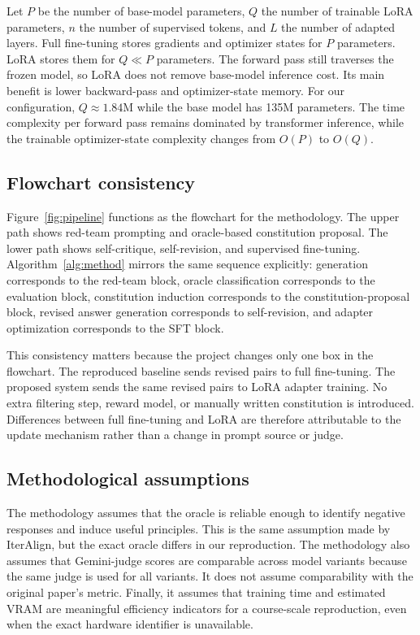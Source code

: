 \documentclass[10pt,twocolumn]{article}
\begin{document}
Let $P$ be the number of base-model parameters, $Q$ the number of trainable LoRA parameters, $n$ the number of supervised tokens, and $L$ the number of adapted layers. Full fine-tuning stores gradients and optimizer states for $P$ parameters. LoRA stores them for $Q \ll P$ parameters. The forward pass still traverses the frozen model, so LoRA does not remove base-model inference cost. Its main benefit is lower backward-pass and optimizer-state memory. For our configuration, $Q \approx 1.84$M while the base model has 135M parameters. The time complexity per forward pass remains dominated by transformer inference, while the trainable optimizer-state complexity changes from $O(P)$ to $O(Q)$.

\subsection{Flowchart consistency}
Figure~\ref{fig:pipeline} functions as the flowchart for the methodology. The upper path shows red-team prompting and oracle-based constitution proposal. The lower path shows self-critique, self-revision, and supervised fine-tuning. Algorithm~\ref{alg:method} mirrors the same sequence explicitly: generation corresponds to the red-team block, oracle classification corresponds to the evaluation block, constitution induction corresponds to the constitution-proposal block, revised answer generation corresponds to self-revision, and adapter optimization corresponds to the SFT block.

This consistency matters because the project changes only one box in the flowchart. The reproduced baseline sends revised pairs to full fine-tuning. The proposed system sends the same revised pairs to LoRA adapter training. No extra filtering step, reward model, or manually written constitution is introduced. Differences between full fine-tuning and LoRA are therefore attributable to the update mechanism rather than a change in prompt source or judge.

\subsection{Methodological assumptions}
The methodology assumes that the oracle is reliable enough to identify negative responses and induce useful principles. This is the same assumption made by IterAlign, but the exact oracle differs in our reproduction. The methodology also assumes that Gemini-judge scores are comparable across model variants because the same judge is used for all variants. It does not assume comparability with the original paper's metric. Finally, it assumes that training time and estimated VRAM are meaningful efficiency indicators for a course-scale reproduction, even when the exact hardware identifier is unavailable.
\end{document}
